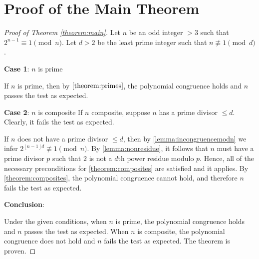 \documentclass{article}
\theoremstyle{plain}
\theoremstyle{definition}
\newcommand{\floor}[1]{\left\lfloor #1 \right\rfloor}
\begin{document}
\section{Proof of the Main Theorem}
\begin{proof}[Proof of Theorem \ref{theorem:main}]
Let $n$ be an odd integer $>3$ such that $2^{n-1} \equiv 1 \pmod{n}$. Let $d > 2$ be the least prime integer such that $n \not\equiv 1 \pmod{d}$.

\textbf{Case 1}: $n$ is prime

If $n$ is prime, then by $\cref{theorem:primes}$, the polynomial congruence holds and $n$ passes the test as expected.

\textbf{Case 2}: $n$ is composite
If $n$ composite, suppose $n$ has a prime divisor $\leq d$. Clearly, it fails the test as expected.

If $n$ does not have a prime divisor $\leq d$, then by \cref{lemma:incongruencemodn} we infer $2^{\floor{n-1}{d}} \not\equiv 1 \pmod{n}$. By \cref{lemma:nonresidue}, it follows that $n$ must have a prime divisor $p$ such that $2$ is not a $d$th power residue modulo $p$. Hence, all of the necessary preconditions for \cref{theorem:composites} are satisfied and it applies. By \cref{theorem:composites}, the polynomial congruence cannot hold, and therefore $n$ fails the test as expected.

\textbf{Conclusion}:

Under the given conditions, when $n$ is prime, the polynomial congruence holds and $n$ passes the test as expected. When $n$ is composite, the polynomial congruence does not hold and $n$ fails the test as expected. The theorem is proven.
\end{proof}
\end{document}
